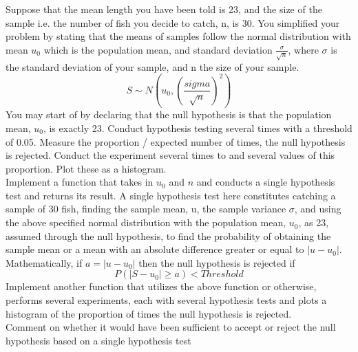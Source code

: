 \documentclass[answers]{exam}
\begin{document}
\subsubsection{} Suppose that the mean length you have been told is 23, and the size of the sample i.e. the number of fish you decide to catch, n, is 30. You simplified your problem by stating that the means of samples follow the normal distribution with mean $u_0$ which is the population mean, and standard deviation $\frac{\sigma}{\sqrt{n}}$, where $\sigma$ is the standard deviation of your sample, and n the size of your sample.\\
\begin{equation}
    S \sim N ( u_0 , ( \frac{ sigma }{\sqrt{n}} ) ^ 2 ) 
\end{equation}
You may start of by declaring that the null hypothesis is that the population mean, $u_0$, is exactly 23. Conduct hypothesis testing several times with a threshold of 0.05. Measure the proportion / expected number of times, the null hypothesis is rejected. Conduct the experiment several times to and several values of this proportion. Plot these as a histogram. \\
Implement a function that takes in $u_0$ and $n$ and conducts a single hypothesis test and returns its result. A single hypothesis test here constitutes catching a sample of 30 fish, finding the sample mean, u, the sample variance $\sigma$, and using the above specified normal distribution with the population mean, $u_0$, as 23, assumed through the null hypothesis, to find the probability of obtaining the sample mean or a mean with an absolute difference greater or equal to $|u - u_0|$. Mathematically, if $a = |u - u_0|$ then the null hypothesis is rejected if \\ 
\begin{equation}
    P(|S - u_0| \geq a) < Threshold 
\end{equation}
Implement another function that utilizes the above function or otherwise, performs several experiments, each with several hypothesis tests and plots a histogram of the proportion of times the null hypothesis is rejected. \\
Comment on whether it would have been sufficient to accept or reject the null hypothesis based on a single hypothesis test \\
\end{document}
